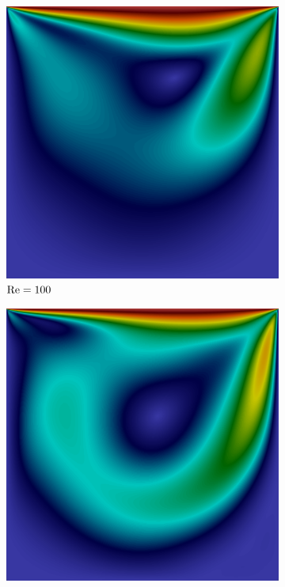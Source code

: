 \begin{figure}[h]
    \centering
    \caption{Campo de velocidades em regime estacionário na cavidade.}
    \begin{subfigure}{0.32\textwidth}
    \includegraphics[width=\linewidth]{Figuras/Cavity/Re100.png}
    \caption{$\mathrm{Re}=100$}
    \end{subfigure}
    \begin{subfigure}{0.32\textwidth}
    \includegraphics[width=\linewidth]{Figuras/Cavity/Re400.png}

\end{subfigure}
\end{figure}

